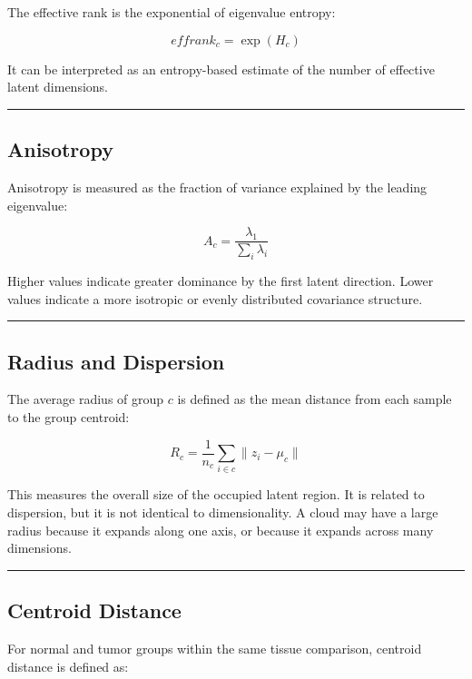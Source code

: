 \documentclass[
  letterpaper,
  DIV=11,
  numbers=noendperiod,
  openany,
  oneside]{scrreprt}
\begin{document}
The effective rank is the exponential of eigenvalue entropy:

\[
effrank_c = \exp(H_c)
\]

It can be interpreted as an entropy-based estimate of the number of
effective latent dimensions.

\begin{center}\rule{0.5\linewidth}{0.5pt}\end{center}

\subsection{Anisotropy}\label{anisotropy}

Anisotropy is measured as the fraction of variance explained by the
leading eigenvalue:

\[
A_c = \frac{\lambda_1}{\sum_i \lambda_i}
\]

Higher values indicate greater dominance by the first latent direction.
Lower values indicate a more isotropic or evenly distributed covariance
structure.

\begin{center}\rule{0.5\linewidth}{0.5pt}\end{center}

\subsection{Radius and Dispersion}\label{radius-and-dispersion}

The average radius of group \(c\) is defined as the mean distance from
each sample to the group centroid:

\[
R_c = \frac{1}{n_c} \sum_{i \in c} \lVert z_i - \mu_c \rVert
\]

This measures the overall size of the occupied latent region. It is
related to dispersion, but it is not identical to dimensionality. A
cloud may have a large radius because it expands along one axis, or
because it expands across many dimensions.

\begin{center}\rule{0.5\linewidth}{0.5pt}\end{center}

\subsection{Centroid Distance}\label{centroid-distance}

For normal and tumor groups within the same tissue comparison, centroid
distance is defined as:
\end{document}
